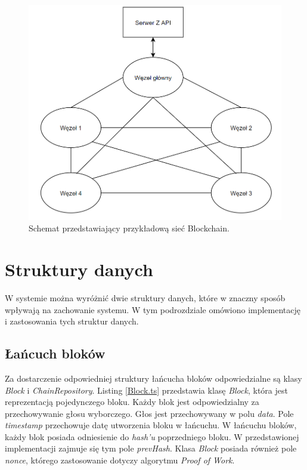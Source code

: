 \documentclass[a4paper,12pt]{book}
\begin{document}
\begin{figure}[h]
  \centering
\includegraphics[width=\textwidth]{images/blockchainarch.png}
\caption{Schemat przedstawiający przykładową sieć Blockchain.}\label{blockchainarch}
\end {figure}

\newpage

\section{Struktury danych}
 
W systemie można wyróżnić dwie struktury danych, które w znaczny sposób wpływają na zachowanie systemu. W tym podrozdziale omówiono implementację i zastosowania tych struktur danych.
 
\subsection{Łańcuch bloków}
 
Za dostarczenie odpowiedniej struktury łańcucha bloków odpowiedzialne są klasy \textit{Block} i \textit{ChainRepository}. Listing \ref{Block.ts} przedstawia klasę \textit{Block}, która jest reprezentacją pojedynczego bloku. Każdy blok jest odpowiedzialny za przechowywanie głosu wyborczego. Głos jest przechowywany w polu \textit{data}. Pole \textit{timestamp} przechowuje datę utworzenia bloku w łańcuchu. W łańcuchu bloków, każdy blok posiada odniesienie do \textit{hash'u} poprzedniego bloku. W przedstawionej implementacji zajmuje się tym pole \textit{prevHash}. Klasa \textit{Block} posiada również pole \textit{nonce}, którego zastosowanie dotyczy algorytmu \textit{Proof of Work}.
\end{document}
